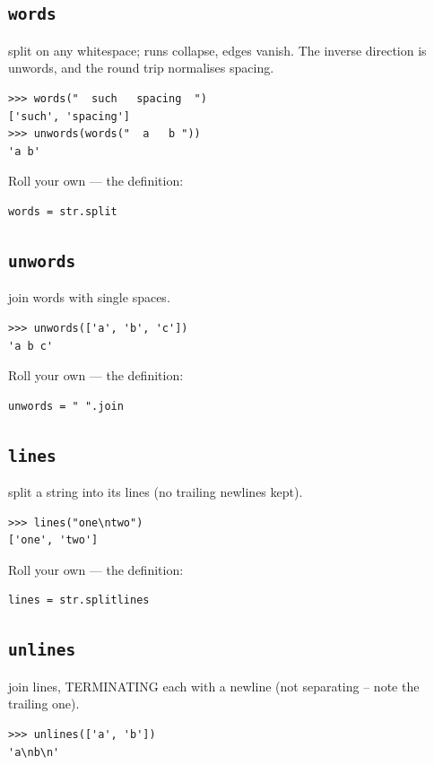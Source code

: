 \documentclass[10pt,letterpaper]{book}
\begin{document}
\subsection{\texttt{words}}\label{def:words}
split on any whitespace; runs collapse, edges vanish. The inverse direction is unwords, and the round trip normalises spacing.
\begin{lstlisting}[style=ex]
>>> words("  such   spacing  ")
['such', 'spacing']
>>> unwords(words("  a   b "))
'a b'
\end{lstlisting}

Roll your own --- the definition:

\begin{lstlisting}[style=ex]
words = str.split
\end{lstlisting}

\subsection{\texttt{unwords}}\label{def:unwords}
join words with single spaces.
\begin{lstlisting}[style=ex]
>>> unwords(['a', 'b', 'c'])
'a b c'
\end{lstlisting}

Roll your own --- the definition:

\begin{lstlisting}[style=ex]
unwords = " ".join
\end{lstlisting}
\subsection{\texttt{lines}}\label{def:lines}
split a string into its lines (no trailing newlines kept).
\begin{lstlisting}[style=ex]
>>> lines("one\ntwo")
['one', 'two']
\end{lstlisting}

Roll your own --- the definition:

\begin{lstlisting}[style=ex]
lines = str.splitlines
\end{lstlisting}
\subsection{\texttt{unlines}}\label{def:unlines}
join lines, TERMINATING each with a newline (not separating -- note the trailing one).
\begin{lstlisting}[style=ex]
>>> unlines(['a', 'b'])
'a\nb\n'
\end{lstlisting}
\end{document}
